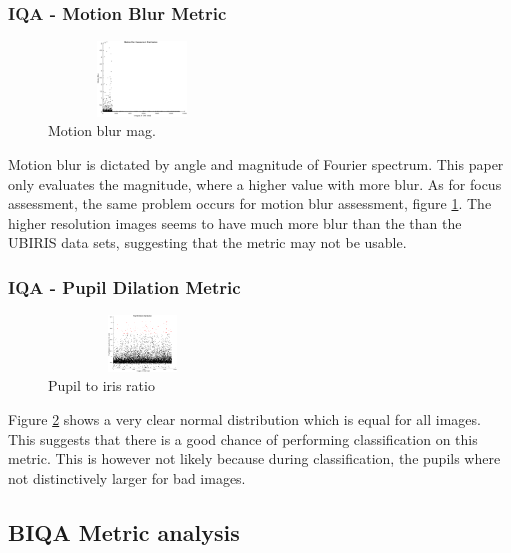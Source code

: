 \vspace{-5mm}
\subsubsection{IQA - Motion Blur Metric}\vspace{-5mm}
	\begin{figure}
		\centering
		\includegraphics[height=2cm, width=5cm]{pics/dist_motion_blur_mag}
		\caption{Motion blur mag. \cite{hugo}}
		\label{fig:motion}
	\end{figure}
Motion blur is dictated by angle and magnitude of Fourier spectrum. This paper 
only evaluates the magnitude, where a higher value with more blur.
As for focus assessment, the same problem occurs for motion blur
assessment, figure \ref{fig:motion}.  The higher resolution images seems to have
much more blur than the than the UBIRIS data sets, suggesting  that the metric
may not be usable.

\vspace{-5mm}
\subsubsection{IQA - Pupil Dilation Metric}\vspace{-5mm}
	\begin{figure}
		\centering
		\includegraphics[height=1.5cm, width=5cm]{pics/dist_pupil_dilation_ratio}
		\caption{Pupil to iris ratio \cite{hugo}}
		\label{fig:ratio}
	\end{figure}
Figure \ref{fig:ratio} shows a very clear normal distribution which is equal
for all images.  This suggests that there is a good chance of performing
classification on this metric. This is however not likely because during
classification, the pupils where not distinctively larger for bad images.



\clearpage
\subsection{BIQA Metric analysis}
\vspace{-3mm}
